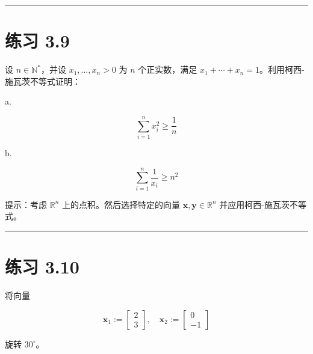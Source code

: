 \medskip\hrule\medskip

\section*{练习 3.9}

设 $ n \in \mathbb{N}^* $，并设 $ x_1, \ldots, x_n > 0 $ 为 $ n $ 个正实数，满足 $ x_1 + \cdots + x_n = 1 $。利用柯西-施瓦茨不等式证明：

a.

\begin{equation*}
\sum_{i=1}^n x_i^2 \geqslant \frac{1}{n}
\end{equation*}

b.

\begin{equation*}
\sum_{i=1}^n \frac{1}{x_i} \geqslant n^2
\end{equation*}

提示：考虑 $ \mathbb{R}^n $ 上的点积。然后选择特定的向量 $ \boldsymbol{x}, \boldsymbol{y} \in \mathbb{R}^n $ 并应用柯西-施瓦茨不等式。

\medskip\hrule\medskip

\section*{练习 3.10}

将向量

\begin{equation*}
\boldsymbol{x}_1 := \begin{bmatrix} 2 \\ 3 \end{bmatrix}, \quad \boldsymbol{x}_2 := \begin{bmatrix} 0 \\ -1 \end{bmatrix}
\end{equation*}

旋转 $ 30^\circ $。

